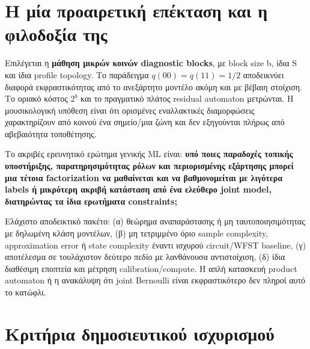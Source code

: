 \documentclass[
  10pt,
  a4paper,
]{report}
\begin{document}
\section{Η μία προαιρετική επέκταση και η φιλοδοξία
της}\label{ux3b7-ux3bcux3afux3b1-ux3c0ux3c1ux3bfux3b1ux3b9ux3c1ux3b5ux3c4ux3b9ux3baux3ae-ux3b5ux3c0ux3adux3baux3c4ux3b1ux3c3ux3b7-ux3baux3b1ux3b9-ux3b7-ux3c6ux3b9ux3bbux3bfux3b4ux3bfux3beux3afux3b1-ux3c4ux3b7ux3c2}

Επιλέγεται η \textbf{μάθηση μικρών κοινών diagnostic blocks}, με block
size b, ίδια S και ίδια profile topology. Το παράδειγμα
\(q(00)=q(11)=1/2\) αποδεικνύει διαφορά εκφραστικότητας από το
ανεξάρτητο μοντέλο ακόμη και με βέβαιη στοίχιση. Το οριακό κόστος
\(2^b\) και το πραγματικό πλάτος residual automaton μετρώνται. Η
μουσικολογική υπόθεση είναι ότι ορισμένες εναλλακτικές διαμορφώσεις
χαρακτηρίζουν από κοινού ένα σημείο/μια ζώνη και δεν εξηγούνται πλήρως
από αβεβαιότητα τοποθέτησης.

Το ακριβές ερευνητικό ερώτημα γενικής ML είναι: \textbf{υπό ποιες
παραδοχές τοπικής υποστήριξης, παρατηρησιμότητας ρόλων και περιορισμένης
εξάρτησης μπορεί μια τέτοια factorization να μαθαίνεται και να
βαθμονομείται με λιγότερα labels ή μικρότερη ακριβή κατάσταση από ένα
ελεύθερο joint model, διατηρώντας τα ίδια ερωτήματα constraints;}

Ελάχιστο αποδεικτικό πακέτο: (α) θεώρημα αναπαράστασης ή μη
ταυτοποιησιμότητας με δηλωμένη κλάση μοντέλων, (β) μη τετριμμένο όριο
sample complexity, approximation error ή state complexity έναντι ισχυρού
circuit/WFST baseline, (γ) αποτέλεσμα σε τουλάχιστον δεύτερο πεδίο με
λανθάνουσα αντιστοίχιση, (δ) ίδια διαθέσιμη εποπτεία και μέτρηση
calibration/compute. Η απλή κατασκευή product automaton ή η ανακάλυψη
ότι joint Bernoulli είναι εκφραστικότερο δεν πληροί αυτό το κατώφλι.

\section{Κριτήρια δημοσιευτικού
ισχυρισμού}\label{ux3baux3c1ux3b9ux3c4ux3aeux3c1ux3b9ux3b1-ux3b4ux3b7ux3bcux3bfux3c3ux3b9ux3b5ux3c5ux3c4ux3b9ux3baux3bfux3cd-ux3b9ux3c3ux3c7ux3c5ux3c1ux3b9ux3c3ux3bcux3bfux3cd}
\end{document}
